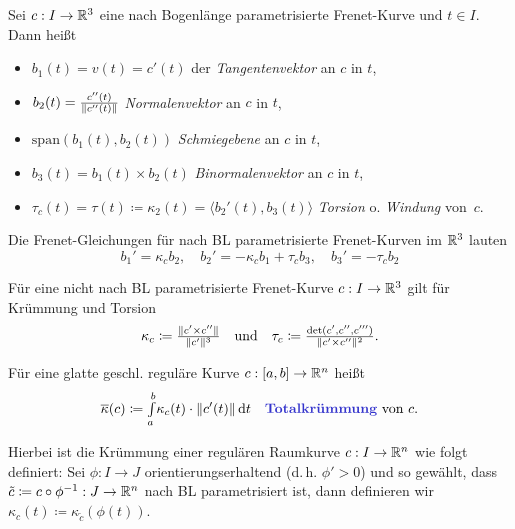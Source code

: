 \documentclass{cheat-sheet}
\newcommand{\Intabdt}[1]{\Int{a}{b}{#1}{t}}
\newcommand{\Span}{\mathrm{span}}
\begin{document}
\begin{defn}
  Sei $c : I \to \mathbb{R}^3$ eine nach Bogenlänge parametrisierte Frenet-Kurve und $t \in I$. Dann heißt
  \begin{itemize}
    \item $b_1(t) = v(t) = c'(t)$ der \emph{Tangentenvektor} an $c$ in $t$,
    \item $b_2(t) = \tfrac{c''(t)}{\lVert c''(t)\rVert}$ \emph{Normalenvektor} an $c$ in $t$,
    \item $\Span(b_1(t), b_2(t))$ \emph{Schmiegebene} an $c$ in $t$,
    \item $b_3(t) = b_1(t) \times b_2(t)$ \emph{Binormalenvektor} an $c$ in $t$,
    \item $\tau_c(t) = \tau(t) \coloneqq \kappa_2(t) = \langle b_2'(t) , b_3(t) \rangle$ \emph{Torsion} o. \emph{Windung} von~$c$.
  \end{itemize}
\end{defn}

\begin{bem}
  Die Frenet-Gleichungen für nach BL parametrisierte Frenet-Kurven im $\mathbb{R}^3$ lauten
  \[
      b_1' = \kappa_c b_2, \quad
      b_2' = - \kappa_c b_1 + \tau_c b_3, \quad
      b_3' = - \tau_c b_2
  \]
\end{bem}


\begin{bem}
  Für eine nicht nach BL parametrisierte Frenet-Kurve $c : I \to \mathbb{R}^3$ gilt für Krümmung und Torsion
  \[
    \kappa_c \coloneqq \tfrac{\lVert c' \times c''\rVert}{\lVert c'\rVert^3}
    \quad \text{und} \quad
    \tau_c \coloneqq \tfrac{\det(c', c'', c''')}{\lVert c' \times c''\rVert^2}.
  \]
\end{bem}


\begin{defn}
  Für eine glatte geschl. reguläre Kurve $c : [a, b] \to \mathbb{R}^n$ heißt
  \[
    \overline\kappa(c) \coloneqq \Intabdt{\kappa_c(t) \cdot \norm{c'(t)}}
    \quad \text{\emph{Totalkrümmung} von $c$.}
  \]

  Hierbei ist die Krümmung einer regulären Raumkurve $c : I \to \mathbb{R}^n$ wie folgt definiert:
  Sei $\phi : I \to J$ orientierungserhaltend
  (d.\,h. $\phi' > 0$) und so gewählt,
  dass $\tilde{c} \coloneqq c \circ \phi^{-1} : J \to \mathbb{R}^n$ nach
  BL parametrisiert ist, dann definieren wir $\kappa_c(t) \coloneqq \kappa_{\tilde{c}}(\phi(t))$.
\end{defn}
\end{document}
